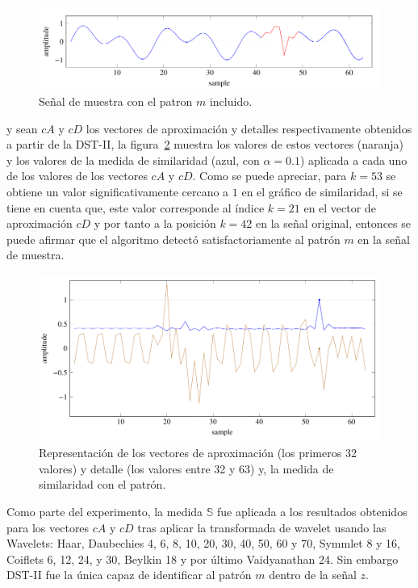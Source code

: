 \begin{figure}[h]
\center
\includegraphics[scale=.4]{Graphics/Signal.png}
\caption{Se\~nal de muestra con el patron $m$ incluido.}
\label{signal-1d}
\end{figure}

y sean $cA$ y $cD$ los vectores de aproximaci\'on y detalles respectivamente obtenidos a partir de la DST-II, la figura~\ref{similaridad-1d} muestra los valores de estos vectores (naranja) y los valores de la medida de similaridad (azul, con $\alpha=0.1$) aplicada a cada uno de los valores de los vectores $cA$ y $cD$. Como se puede apreciar, para $k=53$ se obtiene un valor significativamente cercano a $1$ en el gr\'afico de similaridad, si se tiene en cuenta que, este valor corresponde al \'indice $k=21$ en el vector de aproximaci\'on $cD$ y por tanto a la posici\'on $k=42$ en la se\~nal original, entonces se puede afirmar que el algoritmo detect\'o satisfactoriamente al patr\'on $m$ en la se\~nal de muestra.

\begin{figure}[h]
\center
\includegraphics[scale=.4]{Graphics/Similarity.png}
\caption{Representaci\'on de los vectores de aproximaci\'on (los primeros 32 valores) y detalle (los valores entre 32 y 63) y, la medida de similaridad con el patr\'on.}
\label{similaridad-1d}
\end{figure}

\par Como parte del experimento, la medida $\mathbb{S}$ fue aplicada a los resultados obtenidos para los vectores $cA$ y $cD$ tras aplicar la transformada de wavelet usando las Wavelets: Haar, Daubechies 4, 6, 8, 10, 20, 30, 40, 50, 60 y 70, Symmlet 8 y 16, Coiﬂets 6, 12, 24, y 30, Beylkin 18 y por \'ultimo Vaidyanathan 24. Sin embargo DST-II fue la \'unica capaz de identificar al patr\'on $m$ dentro de la se\~nal $z$.

